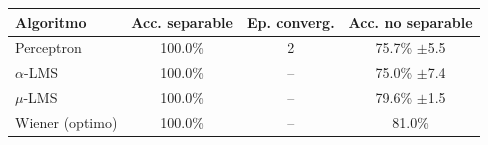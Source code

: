 \begin{tabular}{@{}lccc@{}}
\toprule
Algoritmo & Acc. separable & Ep. converg. & Acc. no separable \\
\midrule
Perceptron & 100.0\% & 2 & 75.7\% $\pm$5.5 \\
$\alpha$-LMS & 100.0\% & -- & 75.0\% $\pm$7.4 \\
$\mu$-LMS & 100.0\% & -- & 79.6\% $\pm$1.5 \\
\midrule
Wiener (optimo) & 100.0\% & -- & 81.0\% \\
\bottomrule
\end{tabular}
